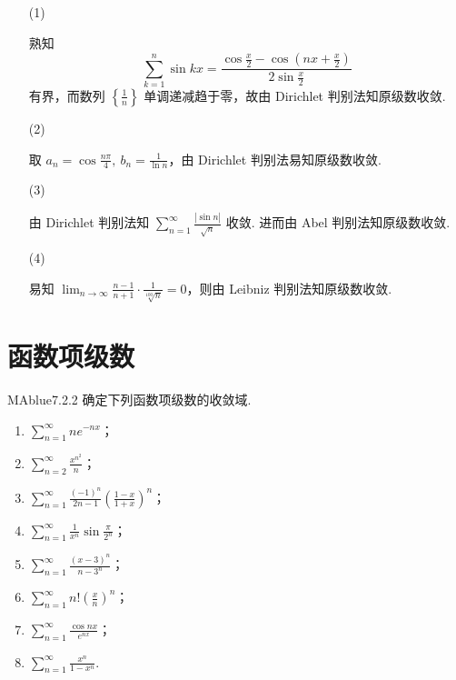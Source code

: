 \begin{enumerate}
    \item[(1)]
    \begin{solution}
        熟知
        \[
            \sum_{k=1}^n \sin kx = \frac{\cos \frac x 2 - \cos \left( nx + \frac x 2 \right)}{2 \sin \frac x 2}
        \]
        有界，而数列 $\left\{ \frac 1 n \right\}$ 单调递减趋于零，故由 Dirichlet 判别法知原级数收敛.
    \end{solution}
    \item[(2)]
    \begin{solution}
        取 $a_n = \cos \frac {n \pi} 4,\ b_n = \frac 1 {\ln n}$，由 Dirichlet 判别法易知原级数收敛.
    \end{solution}
    \item[(3)]
    \begin{solution}
        由 Dirichlet 判别法知 $\sum_{n=1}^{\infty} \frac{|\sin n|}{\sqrt n}$ 收敛. 进而由 Abel 判别法知原级数收敛.
    \end{solution}
    \item[(4)]
    \begin{solution}
        易知 $\lim_{n \to \infty} \frac{n-1}{n+1} \cdot \frac 1 {\sqrt[100] n} = 0$，则由 Leibniz 判别法知原级数收敛.
    \end{solution}
\end{enumerate}

\section{函数项级数}

\begin{problem}{MAblue}{7.2.2}
    确定下列函数项级数的收敛域.
    \begin{multicols}{2}
        \begin{enumerate}[label={(\arabic*)}]
            \item $\displaystyle \sum_{n=1}^\infty ne^{-nx}$；
            \item $\displaystyle \sum_{n=2}^\infty \frac {x^{n^2}} n$；
            \item $\displaystyle \sum_{n=1}^\infty \frac{(-1)^n}{2n-1} \left( \frac{1-x}{1+x} \right)^n$；
            \item $\displaystyle \sum_{n=1}^\infty \frac 1 {x^n} \sin \frac \pi {2^n}$；
            \item $\displaystyle \sum_{n=1}^\infty \frac{(x-3)^n}{n-3^n}$；
            \item $\displaystyle \sum_{n=1}^\infty n! \left( \frac x n \right)^n$；
            \item $\displaystyle \sum_{n=1}^\infty \frac{\cos nx}{e^{nx}}$；
            \item $\displaystyle \sum_{n=1}^\infty \frac{x^n}{1-x^n}$.
        \end{enumerate}
    \end{multicols}
\end{problem}


